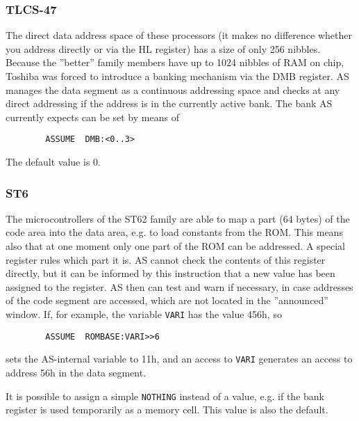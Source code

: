 \documentclass[12pt,twoside]{report}
\newcommand{\tty}[1]{{\tt #1}}
\begin{document}

\subsubsection{TLCS-47}

The direct data address space of these processors (it makes no
difference whether you address directly or via the HL register) has a
size of only 256 nibbles.  Because the ''better'' family members have
up to 1024 nibbles of RAM on chip, Toshiba was forced to introduce a
banking mechanism via the DMB register.  AS manages the data segment
as a continuous addressing space and checks at any direct addressing
if the address is in the currently active bank.  The bank AS
currently expects can be set by means of
\begin{verbatim}
        ASSUME  DMB:<0..3>
\end{verbatim}
The default value is 0.


\subsubsection{ST6}
\label{ST6Assume}

The microcontrollers of the ST62 family are able to map a part (64 bytes)
of the code area into the data area, e.g. to load constants from the ROM.
This means also that at one moment only one part of the ROM can be
addressed.  A special register rules which part it is.  AS cannot check
the contents of this register directly, but it can be informed by this
instruction that a new value has been assigned to the register.  AS then
can test and warn if necessary, in case addresses of the code segment are
accessed, which are not located in the ''announced'' window.  If, for
example, the variable \tty{VARI} has the value 456h, so
\begin{verbatim}
        ASSUME  ROMBASE:VARI>>6
\end{verbatim}
sets the AS-internal variable to 11h, and an access to \tty{VARI}
generates an access to address 56h in the data segment.

It is possible to assign a simple \tty{NOTHING} instead of a value, e.g.
if the bank register is used temporarily as a memory cell.  This value is
also the default.
\end{document}
